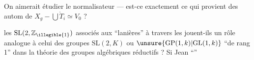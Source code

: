On aimerait étudier le normalisateur --- est-ce exactement ce qui provient des autom de $X_g-\bigcup\mathring{T}_i\simeq V_0$ ?

les $\mathrm{SL}(2,\mathbb Z_{\illegible{1}})$ associés aux ``lanières'' à travers les   jouent-ils un rôle analogue à celui des groupes $\mathrm{SL}(2,K)$ ou $\unsure{\mathrm{GP}(1,k)|\mathrm{GL}(1,k)}$ ``de rang 1'' dans la théorie des groupes algébriques réductifs ? Si Jean  ``''

